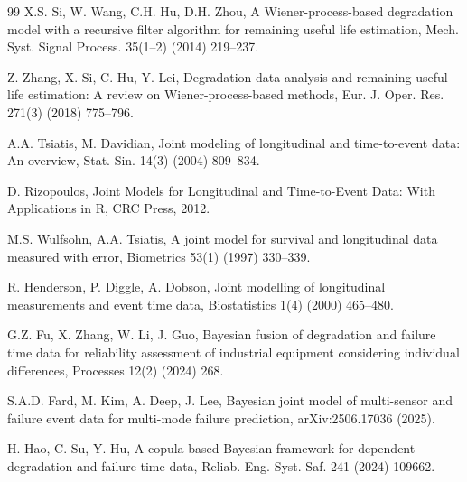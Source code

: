 \documentclass[a4paper,fleqn,longmktitle]{cas-sc}
\begin{document}
\begin{thebibliography}{99}
X.S. Si, W. Wang, C.H. Hu, D.H. Zhou, A Wiener-process-based degradation model with a recursive filter algorithm for remaining useful life estimation, Mech. Syst. Signal Process. 35(1--2) (2014) 219--237.





Z. Zhang, X. Si, C. Hu, Y. Lei, Degradation data analysis and remaining useful life estimation: A review on Wiener-process-based methods, Eur. J. Oper. Res. 271(3) (2018) 775--796.





A.A. Tsiatis, M. Davidian, Joint modeling of longitudinal and time-to-event data: An overview, Stat. Sin. 14(3) (2004) 809--834.





D. Rizopoulos, Joint Models for Longitudinal and Time-to-Event Data: With Applications in R, CRC Press, 2012.





M.S. Wulfsohn, A.A. Tsiatis, A joint model for survival and longitudinal data measured with error, Biometrics 53(1) (1997) 330--339.





R. Henderson, P. Diggle, A. Dobson, Joint modelling of longitudinal measurements and event time data, Biostatistics 1(4) (2000) 465--480.





G.Z. Fu, X. Zhang, W. Li, J. Guo, Bayesian fusion of degradation and failure time data for reliability assessment of industrial equipment considering individual differences, Processes 12(2) (2024) 268.





S.A.D. Fard, M. Kim, A. Deep, J. Lee, Bayesian joint model of multi-sensor and failure event data for multi-mode failure prediction, arXiv:2506.17036 (2025).





H. Hao, C. Su, Y. Hu, A copula-based Bayesian framework for dependent degradation and failure time data, Reliab. Eng. Syst. Saf. 241 (2024) 109662.






\end{thebibliography}
\end{document}
